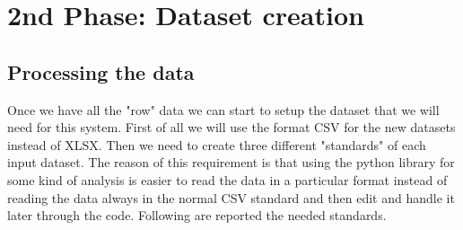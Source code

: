 \newpage
\section{2nd Phase: Dataset creation}
\subsection{Processing the data}

Once we have all the "row" data we can start to setup the dataset that we will need for this system. 
First of all we will use the format CSV for the new datasets instead of XLSX.
Then we need to create three different "standards" of each input dataset. The reason of this requirement is that using the python library for some kind of analysis is easier to read the data in a particular format instead of reading the data always in the normal CSV standard and then edit and handle it later through the code.
Following are reported the needed standards.

